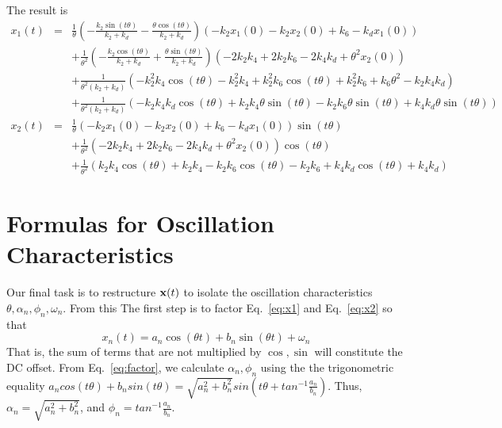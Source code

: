 \documentclass{bmcart}
\begin{document}
The result is
\begin{eqnarray}
x_1 (t) & =  &
\frac{1}{\theta}
\left(- \frac{k_{2} \sin{\left(t \theta \right)}}{k_{2} + k_{d}} - \frac{\theta \cos{\left(t \theta \right)}}{k_{2} + k_{d}}\right)
\left(- k_{2} x_1 (0) - k_{2} x_2 (0) + k_{6} - k_{d} x_1 (0)\right)\\ \nonumber
& & + \frac{1}{\theta^2}
\left(- \frac{k_{2} \cos{\left(t \theta \right)}}{k_{2} + k_{d}} + \frac{\theta \sin{\left(t \theta \right)}}{k_{2} + k_{d}}\right) \left(- 2 k_{2} k_{4} + 2 k_{2} k_{6} - 2 k_{4} k_{d} + \theta^{2} x_2 (0)\right)   \\ \nonumber
& & + \frac{1}{\theta^2 (k_2 + k_d)} \left(
- k_{2}^{2} k_{4} \cos{\left(t \theta \right)} - k_{2}^{2} k_{4} + k_{2}^{2} k_{6} \cos{\left(t \theta \right) + k_2^2 k_6 + k_6 \theta^2 -k_2 k_4 k_d} \right) \\ \nonumber
& & + \frac{1}{\theta^2 (k_2 + k_d)} \left(
- k_{2} k_{4} k_{d} \cos{\left(t \theta \right)}
 + k_{2} k_{4} \theta \sin{\left(t \theta \right)} - k_{2} k_{6} \theta \sin{\left(t \theta \right)} + k_{4} k_{d} \theta \sin{\left(t \theta \right)} \right)
 \label{eq:x1}
\end{eqnarray}
\begin{eqnarray}
x_2 (t) & = &
\frac{1}{\theta}
\left(- k_{2} x_1 (0) - k_{2} x_2 (0) + k_{6} - k_{d} x_1 (0)\right) \sin{\left(t \theta \right)} \\ \nonumber
& & + \frac{1}{\theta^2}
\left(- 2 k_{2} k_{4} + 2 k_{2} k_{6} - 2 k_{4} k_{d} + \theta^{2} x_2 (0)\right) \cos{\left(t \theta \right)} \\ \nonumber
& & + \frac{1}{\theta^2}
\left( k_{2} k_{4} \cos{\left(t \theta \right)} + k_{2} k_{4} - k_{2} k_{6} \cos{\left(t \theta \right)} - k_{2} k_{6} + k_{4} k_{d} \cos{\left(t \theta \right)} + k_{4} k_{d} \right)
 \label{eq:x2}
\end{eqnarray}

\section{Formulas for Oscillation Characteristics}
Our final task is to restructure ${\bf x} (t)$ to isolate the
oscillation characteristics $\theta, \alpha_n, \phi_n, \omega_n$.
From this
The first step is to factor
Eq.~\ref{eq:x1} and Eq.~\ref{eq:x2} so that 
\begin{equation}
x_n (t) = a_n \cos(\theta t) + b_n \sin(\theta t) + \omega_n
\label{eq:factor}
\end{equation}
That is, the sum of terms that are not multiplied by $\cos, \sin$ will constitute the DC offset.
From Eq.~\ref{eq:factor}, we calculate $\alpha_n, \phi_n$ using the
the trigonometric equality
$a_n cos(t \theta) + b_n sin(t \theta) = \sqrt{a_n^2 + b_n^2} sin(t \theta + tan^{-1}\frac{a_n}{b_n}).$
Thus, $\alpha_n = \sqrt{a_n^2 + b_n^2}$, and
$\phi_n = tan^{-1}\frac{a_n}{b_n}.$
\end{document}
